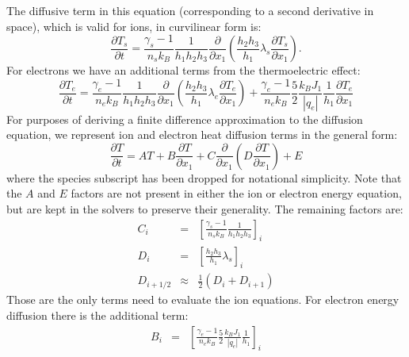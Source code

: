 \documentclass[11pt,letterpaper]{article}
\begin{document}
The diffusive term in this equation (corresponding to a second derivative in space), which is valid for ions, in curvilinear form is:
\begin{equation}
\frac{\partial T_s}{\partial t}  = \frac{\gamma_s - 1}{n_s k_B} \frac{1}{h_1 h_2 h_3} \frac{\partial}{\partial x_1} \left( \frac{h_2 h_3}{h_1} \lambda_s \frac{\partial T_s}{\partial x_1} \right).
\end{equation}
For electrons we have an additional terms from the thermoelectric effect:
\begin{equation}
\frac{\partial T_e}{\partial t} = \frac{\gamma_e - 1}{n_e k_B} \frac{1}{h_1 h_2 h_3} \frac{\partial}{\partial x_1} \left( \frac{h_2 h_3}{h_1} \lambda_e \frac{\partial T_e}{\partial x_1} \right) + \frac{\gamma_e - 1}{n_e k_B} \frac{5}{2} \frac{k_B J_1}{|q_e|} \frac{1}{h_1} \frac{\partial T_e}{\partial x_1}
\end{equation}
For purposes of deriving a finite difference approximation to the diffusion equation, we represent ion and electron heat diffusion terms in the general form:
\begin{equation}
\frac{\partial T}{\partial t} =  A T  + B \frac{\partial T}{\partial x_1} + C \frac{\partial}{\partial x_1} \left( D \frac{\partial T}{\partial x_1} \right) + E \label{eqn:generaldiff}
\end{equation}
where the species subscript has been dropped for notational simplicity.  Note that the $A$ and $E$ factors are not present in either the ion or electron energy equation, but are kept in the solvers to preserve their generality.  The remaining factors are:
\begin{eqnarray}
C_i &=& \left[ \frac{\gamma_s - 1}{n_s k_B} \frac{1}{h_1 h_2 h_3} \right]_i \nonumber \\ 
D_i &=& \left[ \frac{h_2 h_3}{h_1} \lambda_s \right]_i \nonumber \\ 
D_{i+1/2} &\approx& \frac{1}{2} \left( D_i + D_{i+1} \right) \nonumber
\end{eqnarray}
Those are the only terms need to evaluate the ion equations.  For electron energy diffusion there is the additional term:
\begin{eqnarray}
B_i &=& \left[ \frac{\gamma_e - 1}{n_e k_B} \frac{5}{2} \frac{k_B J_1}{|q_e|} \frac{1}{h_1} \right]_i \nonumber 
\end{eqnarray}
\end{document}
